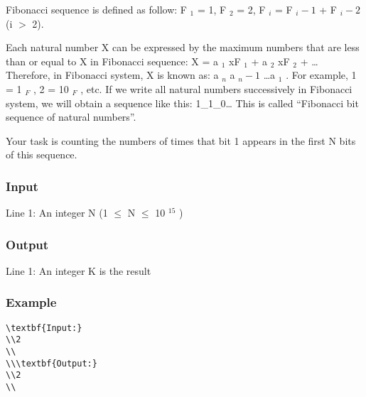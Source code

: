 



   Fibonacci sequence is defined as follow: F   $_    1   $   = 1, F   $_    2   $   = 2, F   $_    i   $   = F   $_    i-1   $   + F   $_    i-2   $   (i $>$ 2).  

   Each natural number X can be expressed by the maximum numbers that are less than or equal to X in Fibonacci sequence: X = a   $_    1   $   xF   $_    1   $   + a   $_    2   $   xF   $_    2   $   + … Therefore, in Fibonacci system, X is known as: a   $_    n   $   a   $_    n-1   $   …a   $_    1   $   . For example, 1 = 1   $_    F   $   , 2 = 10   $_    F   $   , etc. If we write all natural numbers successively in Fibonacci system, we will obtain a sequence like this: 1\_1\_0… This is called “Fibonacci bit sequence of natural numbers”.  

   Your task is counting the numbers of times that bit 1 appears in the first N bits of this sequence.  

\subsubsection{   Input  }

   Line 1: An integer N (1  $\le$  N  $\le$  10   $^    15   $   )  

\subsubsection{   Output  }

   Line 1: An integer K is the result  

\subsubsection{   Example  }
\begin{verbatim}
\textbf{Input:}
\\2
\\
\\\textbf{Output:}
\\2
\\\end{verbatim}
